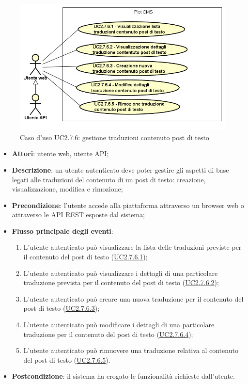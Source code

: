         \begin{figure}[H]
            \centering
            \includegraphics[scale=0.95, width=\textwidth]{immagini/usecase/UC2-7-6.png}
            \caption{Caso d'uso UC2.7.6: gestione traduzioni contenuto post di testo}\label{fig:UC2.7.6} 
        \end{figure}
\begin{itemize}
\item \textbf{Attori}: utente web, utente API;
\item \textbf{Descrizione}: un utente autenticato deve poter gestire gli aspetti di base legati alle traduzioni del contenuto di un post di testo: creazione, visualizzazione, modifica e rimozione; 
      \item \textbf{Precondizione}: l'utente accede alla piattaforma attraverso un browser web o attraverso le API REST esposte dal sistema;

        \item \textbf{Flusso principale degli eventi}:
          \begin{enumerate}
          \item L'utente autenticato può visualizzare la lista delle traduzioni previste per il contenuto del post di testo (\hyperlink{UC2.7.6.1}{UC2.7.6.1});
          \item L'utente autenticato può visualizzare i dettagli di una particolare traduzione prevista per il contenuto del post di testo (\hyperlink{UC2.7.6.2}{UC2.7.6.2});
          \item L'utente autenticato può creare una nuova traduzione per il contenuto del post di testo (\hyperlink{UC2.7.6.3}{UC2.7.6.3});
          \item L'utente autenticato può modificare i dettagli di una particolare traduzione per il contenuto del post di testo (\hyperlink{UC2.7.6.4}{UC2.7.6.4});
          \item L'utente autenticato può rimuovere una traduzione relativa al contenuto del post di testo (\hyperlink{UC2.7.6.5}{UC2.7.6.5}).

      \end{enumerate}
    \item \textbf{Postcondizione}: il sistema ha erogato le funzionalità richieste dall'utente.
  \end{itemize}
\hypertarget{UC2.7.6.1}{}
